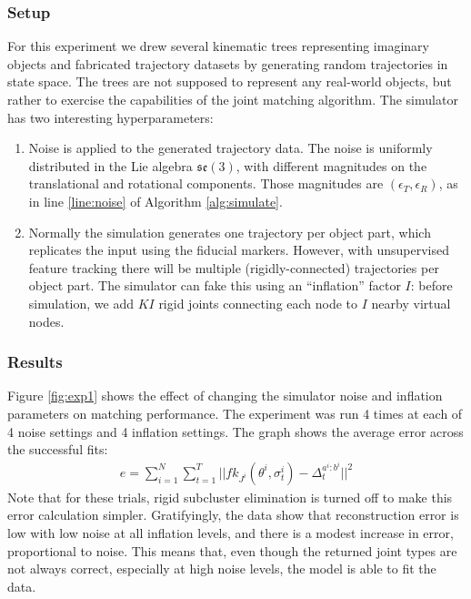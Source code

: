 \documentclass[letterpaper, 10 pt, conference]{ieeeconf}  %
\begin{document}
\subsubsection{Setup}
For this experiment we drew several kinematic trees representing imaginary objects and fabricated trajectory datasets by generating random trajectories in state space. The trees are not supposed to represent any real-world objects, but rather to exercise the capabilities of the joint matching algorithm. The simulator has two interesting hyperparameters:
\begin{enumerate}
  \item Noise is applied to the generated trajectory data. The noise is uniformly distributed in the Lie algebra $\mathfrak{se}(3)$, with different magnitudes on the translational and rotational components. Those magnitudes are $(\epsilon_T, \epsilon_R)$, as in line \ref{line:noise} of Algorithm \ref{alg:simulate}.
  \item Normally the simulation generates one trajectory per object part, which replicates the input using the fiducial markers. However, with unsupervised feature tracking there will be multiple (rigidly-connected) trajectories per object part. The simulator can fake this using an ``inflation'' factor $I$: before simulation, we add $KI$ rigid joints connecting each node to $I$ nearby virtual nodes.
\end{enumerate}

\subsubsection{Results}
Figure \ref{fig:exp1} shows the effect of changing the simulator noise and inflation parameters on matching performance. The experiment was run 4 times at each of 4 noise settings and 4 inflation settings. The graph shows the average error across the successful fits:
\begin{align}
  e = \sum_{i=1}^N \sum_{t=1}^T || fk_{J^i}(\theta^i, \sigma^i_t) - \Delta^{a^i:b^i}_t ||^2
\end{align}
Note that for these trials, rigid subcluster elimination is turned off to make this error calculation simpler. Gratifyingly, the data show that reconstruction error is low with low noise at all inflation levels, and there is a modest increase in error, proportional to noise. This means that, even though the returned joint types are not always correct, especially at high noise levels, the model is able to fit the data.
\end{document}
